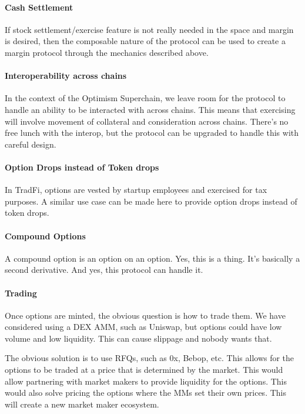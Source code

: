 \paragraph*{Cash Settlement}
If stock settlement/exercise feature is not really needed in the space and margin is desired, 
then the composable nature of the protocol can be used to create a margin protocol through the mechanics described above. 


\paragraph*{Interoperability across chains}

In the context of the Optimism Superchain, we leave room for the protocol to handle an ability to be interacted with across chains.
This means that exercising will involve movement of collateral and consideration across chains.
There's no free lunch with the interop, but the protocol can be upgraded to handle this with careful design.

\paragraph*{Option Drops instead of Token drops}
In TradFi, options are vested by startup employees and exercised for tax purposes.
A similar use case can be made here to provide option drops instead of token drops.

\paragraph*{Compound Options}
A compound option is an option on an option. Yes, this is a thing. It's basically a second derivative.
And yes, this protocol can handle it. 

\paragraph*{Trading}

Once options are minted, the obvious question is how to trade them. We
have considered using a DEX AMM, such as Uniswap, but options could have
low volume and low liquidity. This can cause slippage and nobody wants
that.

The obvious solution is to use RFQs, such as 0x, Bebop, etc. This allows
for the options to be traded at a price that is determined by the
market. This would allow partnering with market makers to provide
liquidity for the options. This would also solve pricing the options
where the MMs set their own prices. This will create a new market maker
ecosystem.

